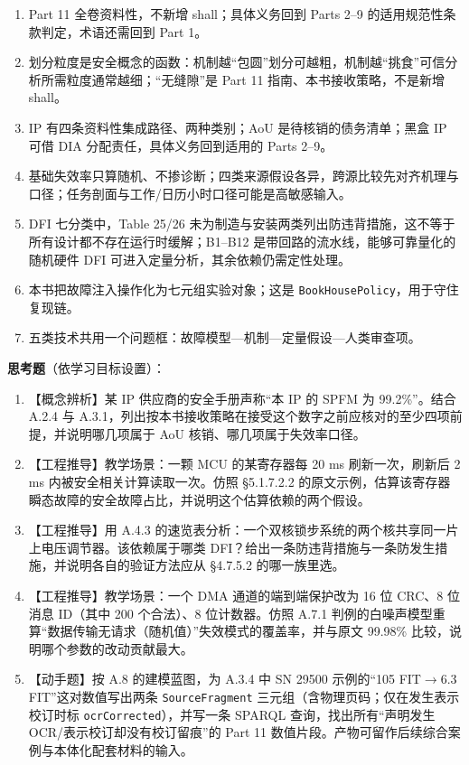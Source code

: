 \begin{enumerate}
\item Part 11 全卷资料性，不新增 shall；具体义务回到 Parts 2–9 的适用规范性条款判定，术语还需回到 Part 1。
\item 划分粒度是安全概念的函数：机制越“包圆”划分可越粗，机制越“挑食”可信分析所需粒度通常越细；“无缝隙”是 Part 11 指南、本书接收策略，不是新增 shall。
\item IP 有四条资料性集成路径、两种类别；AoU 是待核销的债务清单；黑盒 IP 可借 DIA 分配责任，具体义务回到适用的 Parts 2–9。
\item 基础失效率只算随机、不掺诊断；四类来源假设各异，跨源比较先对齐机理与口径；任务剖面与工作/日历小时口径可能是高敏感输入。
\item DFI 七分类中，Table 25/26 未为制造与安装两类列出防违背措施，这不等于所有设计都不存在运行时缓解；B1–B12 是带回路的流水线，能够可靠量化的随机硬件 DFI 可进入定量分析，其余依赖仍需定性处理。
\item 本书把故障注入操作化为七元组实验对象；这是 \nolinkurl{BookHousePolicy}，用于守住复现链。
\item 五类技术共用一个问题框：故障模型—机制—定量假设—人类审查项。
\end{enumerate}

\textbf{思考题}（依学习目标设置）：

\begin{enumerate}
\item 【概念辨析】某 IP 供应商的安全手册声称“本 IP 的 SPFM 为 99.2\%”。结合 A.2.4 与 A.3.1，列出按本书接收策略在接受这个数字之前应核对的至少四项前提，并说明哪几项属于 AoU 核销、哪几项属于失效率口径。
\item 【工程推导】教学场景：一颗 MCU 的某寄存器每 20 ms 刷新一次，刷新后 2 ms 内被安全相关计算读取一次。仿照 §5.1.7.2.2 的原文示例，估算该寄存器瞬态故障的安全故障占比，并说明这个估算依赖的两个假设。
\item 【工程推导】用 A.4.3 的速览表分析：一个双核锁步系统的两个核共享同一片上电压调节器。该依赖属于哪类 DFI？给出一条防违背措施与一条防发生措施，并说明各自的验证方法应从 §4.7.5.2 的哪一族里选。
\item 【工程推导】教学场景：一个 DMA 通道的端到端保护改为 16 位 CRC、8 位消息 ID（其中 200 个合法）、8 位计数器。仿照 A.7.1 判例的白噪声模型重算“数据传输无请求（随机值）”失效模式的覆盖率，并与原文 99.98\% 比较，说明哪个参数的改动贡献最大。
\item 【动手题】按 A.8 的建模蓝图，为 A.3.4 中 SN 29500 示例的“105 FIT\(\rightarrow\)6.3 FIT”这对数值写出两条 \nolinkurl{SourceFragment} 三元组（含物理页码；仅在发生表示校订时标 \nolinkurl{ocrCorrected}），并写一条 SPARQL 查询，找出所有“声明发生 OCR/表示校订却没有校订留痕”的 Part 11 数值片段。产物可留作后续综合案例与本体化配套材料的输入。
\end{enumerate}

